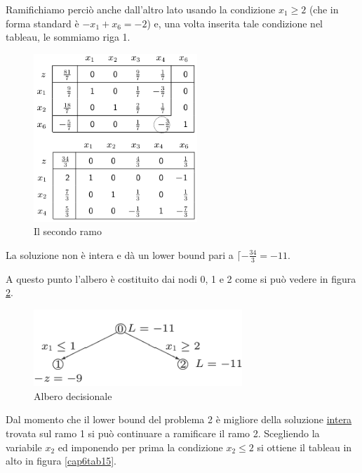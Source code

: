 \documentclass[11pt]{book}
\begin{document}
Ramifichiamo perci\`o anche dall'altro lato usando la condizione $x_1
\geq 2$ (che in forma standard \`e $-x_1 + x_6 = -2$) e, una volta
inserita tale condizione nel tableau, le sommiamo riga 1.

\begin{figure}[h!]
  \centering
  \includegraphics[width=0.55\textwidth]{images/cap6tab14.png}
  \caption{Il secondo ramo}
  \label{cap6tab14}
\end{figure}

La soluzione non \`e intera e d\`a un lower bound pari a $\lceil
-\frac{34}{3} = -11$.

A questo punto l'albero \`e costituito dai nodi 0, 1 e 2 come si pu\`o
vedere in figura \ref{cap6albero}.

\begin{figure}[h!]
  \centering
  \includegraphics[width=0.7\textwidth]{images/cap6albero.png}
  \caption{Albero decisionale}
  \label{cap6albero}
\end{figure}

Dal momento che il lower bound del problema 2 \`e migliore della
soluzione \underline{intera} trovata sul ramo 1 si pu\`o continuare a
ramificare il ramo 2. Scegliendo la variabile $x_2$ ed imponendo per
prima la condizione $x_2 \leq 2$ si ottiene il tableau in alto in
figura \ref{cap6tab15}. 
\end{document}
